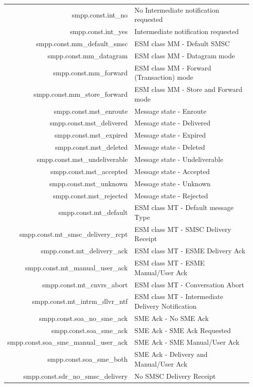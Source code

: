 \documentclass[a4paper,latin]{paper}
\begin{document}
\begin{tabularx}{\linewidth}{ | >{\ttfamily} r | >{\ttfamily} X |}
	smpp.const.int\_no				& No Intermediate notification requested\\
	smpp.const.int\_yes				& Intermediate notification requested\\
	smpp.const.mm\_default\_smsc			& ESM class MM - Default SMSC\\
	smpp.const.mm\_datagram				& ESM class MM - Datagram mode\\
	smpp.const.mm\_forward				& ESM class MM - Forward (Transaction) mode\\
	smpp.const.mm\_store\_forward			& ESM class MM - Store and Forward mode\\
	smpp.const.mst\_enroute				& Message state - Enroute\\
	smpp.const.mst\_delivered			& Message state - Delivered\\
	smpp.const.mst\_expired				& Message state - Expired\\
	smpp.const.mst\_deleted				& Message state - Deleted\\
	smpp.const.mst\_undeliverable			& Message state - Undeliverable\\
	smpp.const.mst\_accepted			& Message state - Accepted\\
	smpp.const.mst\_unknown				& Message state - Unknown\\
	smpp.const.mst\_rejected			& Message state - Rejected\\
	smpp.const.mt\_default				& ESM class MT - Default message Type\\
	smpp.const.mt\_smsc\_delivery\_rcpt		& ESM class MT - SMSC Delivery Receipt\\
	smpp.const.mt\_delivery\_ack			& ESM class MT - ESME Delivery Ack\\
	smpp.const.mt\_manual\_user\_ack		& ESM class MT - ESME Manual/User Ack\\
	smpp.const.mt\_cnvrs\_abort			& ESM class MT - Conversation Abort\\
	smpp.const.mt\_intrm\_dlvr\_ntf			& ESM class MT - Intermediate Delivery Notification\\
	smpp.const.soa\_no\_sme\_ack			& SME Ack - No SME Ack\\
	smpp.const.soa\_sme\_ack			& SME Ack - SME Ack Requested\\
	smpp.const.soa\_sme\_manual\_user\_ack		& SME Ack - SME Manual/User Ack\\
	smpp.const.soa\_sme\_both			& SME Ack - Delivery and Manual/User Ack \\
	smpp.const.sdr\_no\_smsc\_delivery		& No SMSC Delivery Receipt\\

\end{tabularx}
\end{document}
